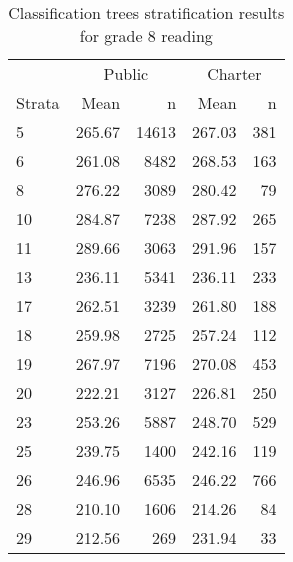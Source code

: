 \begin{table}[h!]
\centering
\caption{Classification trees stratification results for grade 8 reading} 
\label{g8read-circpsa-tree}
\begin{tabular}{lrr@{\extracolsep{.2cm}}rr}
  \hline
   & \multicolumn{2}{c}{Public} & \multicolumn{2}{c}{Charter} \\ \cline{2-3} \cline{4-5} Strata & Mean & n & Mean & n \\ \hline
5 & 265.67 & 14613 & 267.03 & 381 \\ 
  6 & 261.08 & 8482 & 268.53 & 163 \\ 
  8 & 276.22 & 3089 & 280.42 &  79 \\ 
  10 & 284.87 & 7238 & 287.92 & 265 \\ 
  11 & 289.66 & 3063 & 291.96 & 157 \\ 
  13 & 236.11 & 5341 & 236.11 & 233 \\ 
  17 & 262.51 & 3239 & 261.80 & 188 \\ 
  18 & 259.98 & 2725 & 257.24 & 112 \\ 
  19 & 267.97 & 7196 & 270.08 & 453 \\ 
  20 & 222.21 & 3127 & 226.81 & 250 \\ 
  23 & 253.26 & 5887 & 248.70 & 529 \\ 
  25 & 239.75 & 1400 & 242.16 & 119 \\ 
  26 & 246.96 & 6535 & 246.22 & 766 \\ 
  28 & 210.10 & 1606 & 214.26 &  84 \\ 
  29 & 212.56 & 269 & 231.94 &  33 \\ 
   \hline
\end{tabular}
\end{table}

